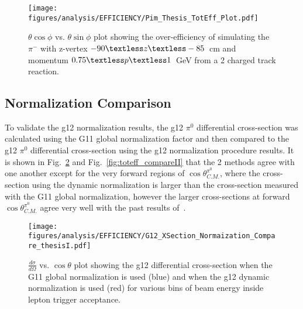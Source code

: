 \begin{figure}[h!]\begin{center}
		\texttt{[image: \\figures/analysis/EFFICIENCY/Pim\_Thesis\_TotEff\_Plot.pdf]}
		\caption[$\theta \cos\phi$ vs. $\theta \sin\phi$ plot showing the over-efficiency of simulating the $\pi^-$ with z-vertex $-90\textless z\textless-85$~cm and momentum $0.75\textless p \textless 1$~GeV from a 2 charged track reaction]{\label{fig:toteff_pim} $\theta \cos\phi$ vs. $\theta \sin\phi$ plot showing the over-efficiency of simulating the $\pi^-$ with z-vertex $-90\textless z\textless-85$~cm and momentum $0.75\textless p \textless 1$~GeV from a 2 charged track reaction.}
\end{center}\end{figure}
\FloatBarrier
%
\subsection{Normalization Comparison}
To validate the g12 normalization results, the g12 $\pi^0$ differential cross-section was calculated using the G11 global normalization factor and then compared to the g12 $\pi^0$ differential cross-section using the g12 normalization procedure results. It is shown in Fig.~\ref{fig:toteff_compareI} and Fig.~\ref{fig:toteff_compareII} that the 2 methods agree with one another except for the very forward regions of $\cos\theta^{\pi^0}_{C.M.}$, where the cross-section using the dynamic normalization is larger than the cross-section measured with the G11 global normalization, however the larger cross-sections at forward $\cos\theta^{\pi^0}_{C.M.}$ agree very well with the past results of~\cite{ELSA11}.

\begin{figure}[h!]\begin{center}
\texttt{[image: \\figures/analysis/EFFICIENCY/G12\_XSection\_Normaization\_Compare\_thesisI.pdf]}
\caption[$\frac{d \sigma}{d \Omega}$ vs. $\cos \theta$ plot showing the g12 \pizT differential cross-section when the G11 global normalization is used (blue) and when the g12 dynamic normalization is used (red) for various bins of beam energy inside lepton trigger acceptance]{\label{fig:toteff_compareI} $\frac{d \sigma}{d \Omega}$ vs. $\cos \theta$ plot showing the g12 \pizT differential cross-section when the G11 global normalization is used (blue) and when the g12 dynamic normalization is used (red) for various bins of beam energy inside lepton trigger acceptance.}
\end{center}\end{figure}

